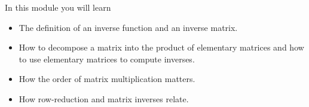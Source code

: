 \begin{module}

	In this module you will learn
	\begin{itemize}
		\item The definition of an inverse function and an inverse matrix.
		\item How to decompose a matrix into the product of elementary matrices and how to use
			elementary matrices to compute inverses.
		\item How the order of matrix multiplication matters.
		\item How row-reduction and matrix inverses relate.
	\end{itemize}

	
	
\end{module}

